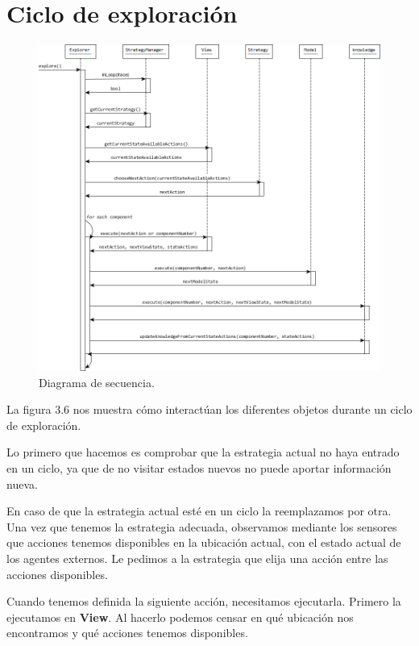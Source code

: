 \section{Ciclo de exploración}

\begin{figure}[H]
  \centering
    \includegraphics[width=1.0\textwidth]{Imagenes/Algoritmo/Secuencia_explorar.png}
  \caption{Diagrama de secuencia.}
  \label{fig:Secuencia_explorar}
\end{figure}

La figura 3.6 nos muestra cómo interactúan los diferentes objetos durante un ciclo de exploración.

Lo primero que hacemos es comprobar que la estrategia actual no haya entrado en un ciclo, ya que de no visitar estados nuevos no puede aportar información nueva.

En caso de que la estrategia actual esté en un ciclo la reemplazamos por otra. Una vez que tenemos la estrategia adecuada, observamos mediante los sensores que 
acciones tenemos disponibles en la ubicación actual, con el estado actual de los agentes externos. Le pedimos a la estrategia que elija una acción entre las 
acciones disponibles.

Cuando tenemos definida la siguiente acción, necesitamos ejecutarla. Primero la ejecutamos en \textbf{View}. Al hacerlo podemos censar en qué ubicación nos 
encontramos y qué acciones tenemos disponibles.

